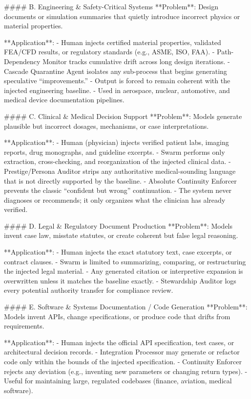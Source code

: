 #### B. Engineering & Safety-Critical Systems
**Problem**: Design documents or simulation summaries that quietly introduce incorrect physics or material properties.

**Application**:
- Human injects certified material properties, validated FEA/CFD results, or regulatory standards (e.g., ASME, ISO, FAA).
- Path-Dependency Monitor tracks cumulative drift across long design iterations.
- Cascade Quarantine Agent isolates any sub-process that begins generating speculative “improvements.”
- Output is forced to remain coherent with the injected engineering baseline.
- Used in aerospace, nuclear, automotive, and medical device documentation pipelines.

#### C. Clinical & Medical Decision Support
**Problem**: Models generate plausible but incorrect dosages, mechanisms, or case interpretations.

**Application**:
- Human (physician) injects verified patient labs, imaging reports, drug monographs, and guideline excerpts.
- Swarm performs only extraction, cross-checking, and reorganization of the injected clinical data.
- Prestige/Persona Auditor strips any authoritative medical-sounding language that is not directly supported by the baseline.
- Absolute Continuity Enforcer prevents the classic “confident but wrong” continuation.
- The system never diagnoses or recommends; it only organizes what the clinician has already verified.

#### D. Legal & Regulatory Document Production
**Problem**: Models invent case law, misstate statutes, or create coherent but false legal reasoning.

**Application**:
- Human injects the exact statutory text, case excerpts, or contract clauses.
- Swarm is limited to summarizing, comparing, or restructuring the injected legal material.
- Any generated citation or interpretive expansion is overwritten unless it matches the baseline exactly.
- Stewardship Auditor logs every potential authority transfer for compliance review.

#### E. Software & Systems Documentation / Code Generation
**Problem**: Models invent APIs, change specifications, or produce code that drifts from requirements.

**Application**:
- Human injects the official API specification, test cases, or architectural decision records.
- Integration Processor may generate or refactor code only within the bounds of the injected specification.
- Continuity Enforcer rejects any deviation (e.g., inventing new parameters or changing return types).
- Useful for maintaining large, regulated codebases (finance, aviation, medical software).

